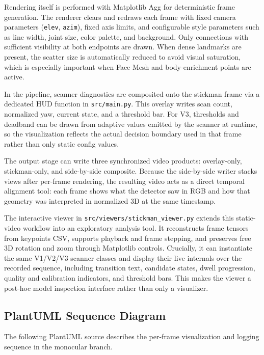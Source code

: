 \documentclass[11pt,a4paper]{article}
\begin{document}
Rendering itself is performed with Matplotlib Agg for deterministic frame generation. The renderer clears and redraws each frame with fixed camera parameters (\texttt{elev}, \texttt{azim}), fixed axis limits, and configurable style parameters such as line width, joint size, color palette, and background. Only connections with sufficient visibility at both endpoints are drawn. When dense landmarks are present, the scatter size is automatically reduced to avoid visual saturation, which is especially important when Face Mesh and body-enrichment points are active.

In the pipeline, scanner diagnostics are composited onto the stickman frame via a dedicated HUD function in \texttt{src/main.py}. This overlay writes scan count, normalized yaw, current state, and a threshold bar. For V3, thresholds and deadband can be drawn from adaptive values emitted by the scanner at runtime, so the visualization reflects the actual decision boundary used in that frame rather than only static config values.

The output stage can write three synchronized video products: overlay-only, stickman-only, and side-by-side composite. Because the side-by-side writer stacks views after per-frame rendering, the resulting video acts as a direct temporal alignment tool: each frame shows what the detector saw in RGB and how that geometry was interpreted in normalized 3D at the same timestamp.

The interactive viewer in \texttt{src/viewers/stickman\_viewer.py} extends this static-video workflow into an exploratory analysis tool. It reconstructs frame tensors from keypoints CSV, supports playback and frame stepping, and preserves free 3D rotation and zoom through Matplotlib controls. Crucially, it can instantiate the same V1/V2/V3 scanner classes and display their live internals over the recorded sequence, including transition text, candidate states, dwell progression, quality and calibration indicators, and threshold bars. This makes the viewer a post-hoc model inspection interface rather than only a visualizer.

\subsection{PlantUML Sequence Diagram}
The following PlantUML source describes the per-frame visualization and logging sequence in the monocular branch.
\end{document}
